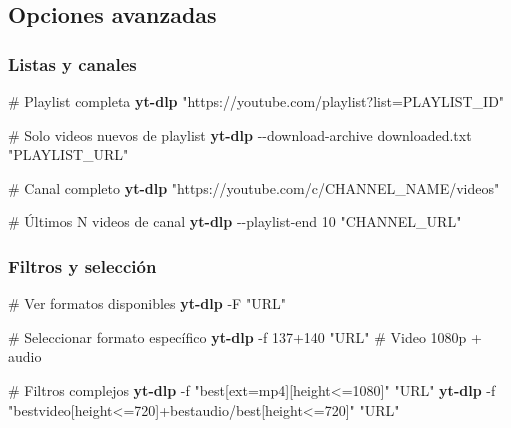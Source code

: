 \documentclass[
  11pt,
  letterpaper,
  oneside,
  openany]{scrbook}
\newenvironment{Shaded}{}{}
\newcommand{\AttributeTok}[1]{\textcolor[rgb]{0.84,0.23,0.29}{#1}}
\newcommand{\CommentTok}[1]{\textcolor[rgb]{0.42,0.45,0.49}{#1}}
\newcommand{\ExtensionTok}[1]{\textcolor[rgb]{0.84,0.23,0.29}{\textbf{#1}}}
\newcommand{\NormalTok}[1]{\textcolor[rgb]{0.14,0.16,0.18}{#1}}
\newcommand{\StringTok}[1]{\textcolor[rgb]{0.01,0.18,0.38}{#1}}
\begin{document}
\subsection{Opciones avanzadas}\label{opciones-avanzadas}

\subsubsection{Listas y canales}\label{listas-y-canales}

\begin{Shaded}
\begin{Highlighting}[]
\CommentTok{\# Playlist completa}
\ExtensionTok{yt{-}dlp} \StringTok{"https://youtube.com/playlist?list=PLAYLIST\_ID"}

\CommentTok{\# Solo videos nuevos de playlist}
\ExtensionTok{yt{-}dlp} \AttributeTok{{-}{-}download{-}archive}\NormalTok{ downloaded.txt }\StringTok{"PLAYLIST\_URL"}

\CommentTok{\# Canal completo}
\ExtensionTok{yt{-}dlp} \StringTok{"https://youtube.com/c/CHANNEL\_NAME/videos"}

\CommentTok{\# Últimos N videos de canal}
\ExtensionTok{yt{-}dlp} \AttributeTok{{-}{-}playlist{-}end}\NormalTok{ 10 }\StringTok{"CHANNEL\_URL"}
\end{Highlighting}
\end{Shaded}

\subsubsection{Filtros y selección}\label{filtros-y-selecciuxf3n}

\begin{Shaded}
\begin{Highlighting}[]
\CommentTok{\# Ver formatos disponibles}
\ExtensionTok{yt{-}dlp} \AttributeTok{{-}F} \StringTok{"URL"}

\CommentTok{\# Seleccionar formato específico}
\ExtensionTok{yt{-}dlp} \AttributeTok{{-}f}\NormalTok{ 137+140 }\StringTok{"URL"}  \CommentTok{\# Video 1080p + audio}

\CommentTok{\# Filtros complejos}
\ExtensionTok{yt{-}dlp} \AttributeTok{{-}f} \StringTok{"best[ext=mp4][height\textless{}=1080]"} \StringTok{"URL"}
\ExtensionTok{yt{-}dlp} \AttributeTok{{-}f} \StringTok{"bestvideo[height\textless{}=720]+bestaudio/best[height\textless{}=720]"} \StringTok{"URL"}
\end{Highlighting}
\end{Shaded}
\end{document}
